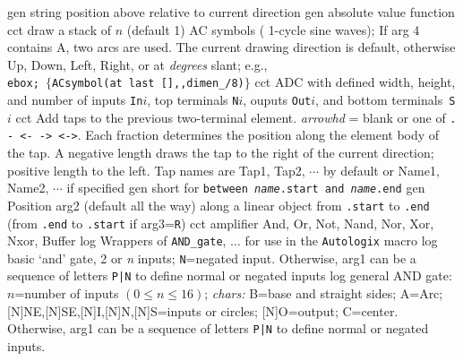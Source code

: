 %
  {gen}
  {string position above relative to current direction}
  {gen}
  {absolute value function}
  {cct}
  {draw a stack of $n$ (default 1) AC symbols
   ( 1-cycle sine waves); If arg 4 contains A, two arcs
   are used.  The current drawing direction is default, otherwise Up, Down,
   Left, Right, or at {\sl degrees} slant;  e.g.,\\ 
   {\tt ebox; $\lbrace$ACsymbol(at last [],{,}dimen\_/8)$\rbrace$}}
  {cct}
  {ADC with defined width, height, and number of inputs {\tt In$i$},
    top terminals {\tt N$i$}, ouputs {\tt Out$i$},
    and bottom terminals~{\tt S$i$}}
  {cct}
  {Add taps to the previous two-terminal element.
   {\sl arrowhd} = blank or one of {\tt . - <- -> <->}.
   Each fraction determines the position along the element body of the tap.
   A negative length draws the tap to the right of the current
   direction; positive length to the left.
   Tap names are Tap1, Tap2, $\cdots$ by default  or
   Name1, Name2, $\cdots$ if specified 
   }
  {gen}
  {short for {\tt between {\sl name}.start and {\sl name}.end}}
  {gen}
  {Position arg2 (default all the way) along a linear object
   from {\tt .start} to {\tt .end}
   (from {\tt .end} to {\tt .start} if arg3={\tt R}) }
  {cct}
  {amplifier}
%
 {And, Or, Not, Nand, Nor, Xor, Nxor, Buffer}{}
  {log}
  {Wrappers of {\tt AND\_gate}, $\ldots$ for use in the {\tt Autologix}
   macro}
  {log}
  {basic `and' gate, 2 or {\sl n\/} inputs; {\tt N}=negated input.
   Otherwise, arg1 can be a sequence of letters {\tt P|N}
   to define normal or negated inputs
    }
  {log}
  {general AND gate: $n$=number of inputs $(0\leq n\leq 16)$;
           {\sl chars:}
           B=base and straight sides; A=Arc;
           [N]NE,[N]SE,[N]I,[N]N,[N]S=inputs or circles;
           [N]O=output; C=center.
   Otherwise, arg1 can be a sequence of letters {\tt P|N}
   to define normal or negated inputs.}
